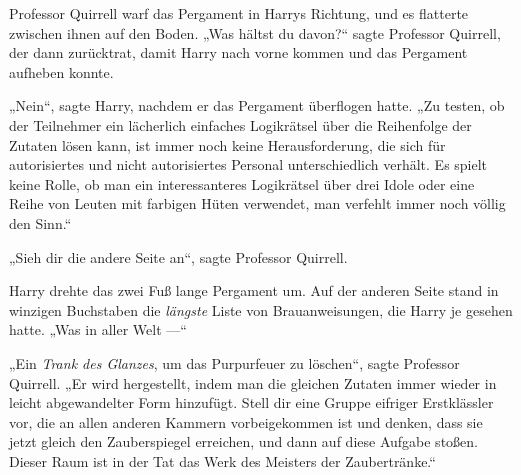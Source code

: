 Professor Quirrell warf das Pergament in Harrys Richtung, und es flatterte zwischen ihnen auf den Boden.
„Was hältst du davon?“ sagte Professor Quirrell, der dann zurücktrat, damit Harry nach vorne kommen und das Pergament aufheben konnte.

„Nein“, sagte Harry, nachdem er das Pergament überflogen hatte.
„Zu testen, ob der Teilnehmer ein lächerlich einfaches Logikrätsel über die Reihenfolge der Zutaten lösen kann, ist immer noch keine Herausforderung, die sich für autorisiertes und nicht autorisiertes Personal unterschiedlich verhält. Es spielt keine Rolle, ob man ein interessanteres Logikrätsel über drei Idole oder eine Reihe von Leuten mit farbigen Hüten verwendet, man verfehlt immer noch völlig den Sinn.“

„Sieh dir die andere Seite an“, sagte Professor Quirrell.

Harry drehte das zwei Fuß lange Pergament um.
Auf der anderen Seite stand in winzigen Buchstaben die \emph{längste} Liste von Brauanweisungen, die Harry je gesehen hatte.
„Was in aller Welt —“

„Ein \emph{Trank des Glanzes}, um das Purpurfeuer zu löschen“, sagte Professor Quirrell.
„Er wird hergestellt, indem man die gleichen Zutaten immer wieder in leicht abgewandelter Form hinzufügt. Stell dir eine Gruppe eifriger Erstklässler vor, die an allen anderen Kammern vorbeigekommen ist und denken, dass sie jetzt gleich den Zauberspiegel erreichen, und dann auf diese Aufgabe stoßen. Dieser Raum ist in der Tat das Werk des Meisters der Zaubertränke.“

